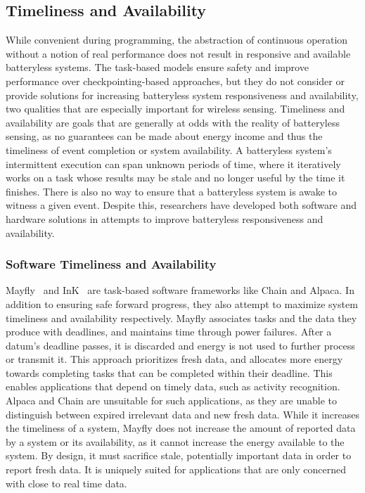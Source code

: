 \subsection{Timeliness and Availability}
While convenient during programming, the abstraction of continuous operation without a notion of real performance does not result in responsive and available batteryless systems.
The task-based models ensure safety and improve performance over checkpointing-based approaches, but they
do not consider or provide solutions for increasing batteryless system responsiveness and availability,
two qualities that are especially important for wireless sensing.
Timeliness and availability are goals that are generally at odds with the reality of batteryless sensing, as no guarantees can be made about energy income and thus the timeliness of event completion or system availability.
A batteryless system's intermittent execution can span unknown periods of time, where it iteratively works on a task whose results may be stale and no longer useful by the time it finishes. There is also no way to ensure that a batteryless system is awake to witness a given event.
Despite this, researchers have developed both software and hardware solutions in attempts to improve batteryless responsiveness and availability.

\subsubsection{Software Timeliness and Availability}
Mayfly~\cite{hesterTimely17} and InK~\cite{yildirim2018ink} are task-based software frameworks like Chain and Alpaca. In addition to ensuring safe forward progress, they also attempt to maximize system timeliness and availability respectively. Mayfly associates tasks and the data they produce with deadlines, and maintains time through power failures.
After a datum's deadline passes, it is discarded and energy is not used to further process or transmit it.
This approach prioritizes fresh data, and allocates more energy towards completing tasks that can be completed within their deadline.
This enables applications that depend on timely data, such as activity recognition. Alpaca and Chain are unsuitable for such applications, as they are unable to distinguish between expired irrelevant data and new fresh data.
While it increases the timeliness of a system, Mayfly does not increase the amount of reported data by a system or its availability, as it cannot increase the energy available to the system. By design, it must sacrifice stale, potentially important data in order to report fresh data.
It is uniquely suited for applications that are only concerned with close to real time data.

